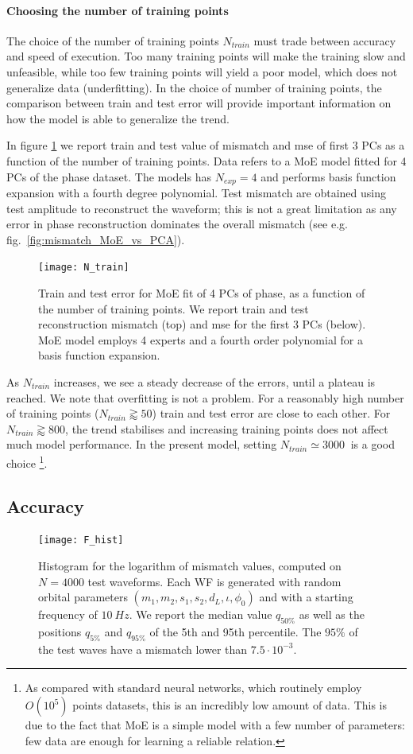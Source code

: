 \paragraph{Choosing the number of training points}
The choice of the number of training points $N_{train}$ must trade between accuracy and speed of execution. Too many training points will make the training slow and unfeasible, while too few training points will yield a poor model, which does not generalize data (underfitting).
In the choice of number of training points, the comparison between train and test error will provide important information on how the model is able to generalize the trend.
\par
In figure \ref{fig:N_train} we report train and test value of mismatch and mse of first 3 PCs as a function of the number of training points. Data refers to a MoE model fitted for 4 PCs of the phase dataset. The models has ${N_{exp} = 4}$ and performs basis function expansion with a fourth degree polynomial. Test mismatch are obtained using test amplitude to reconstruct the waveform; this is not a great limitation as any error in phase reconstruction dominates the overall mismatch (see e.g. fig.~\ref{fig:mismatch_MoE_vs_PCA}).
\begin{figure}
	\centering
    \texttt{[image: N\_train]}
	\caption{Train and test error for MoE fit of 4 PCs of phase, as a function of the number of training points. We report train and test reconstruction mismatch (top) and mse for the first 3 PCs (below).
    MoE model employs 4 experts and a fourth order polynomial for a basis function expansion.
    }
	\label{fig:N_train}
\end{figure}
\par
As $N_{train}$ increases, we see a steady decrease of the errors, until a plateau is reached.
We note that overfitting is not a problem. For a reasonably high number of training points ($N_{train} \gtrapprox 50$) train and test error are close to each other.
For $N_{train} \gtrapprox 800$, the trend stabilises and increasing training points does not affect much model performance.
In the present model, setting $N_{train} \simeq \SI{3000}{}$ is a good choice
\footnote{As compared with standard neural networks, which routinely employ $O(10^5)$ points datasets, this is an incredibly low amount of data. This is due to the fact that MoE is a simple model with a few number of parameters: few data are enough for learning a reliable relation.}.
\subsection{Accuracy}
\begin{figure}
	\centering
    \texttt{[image: F\_hist]}
	\caption{Histogram for the logarithm of mismatch values, computed on $N=4000$ test waveforms. Each WF is generated with random orbital parameters $(m_1,m_2, s_1, s_2, d_L, \iota, \phi_0)$ and with a starting frequency of $\SI{10}{Hz}$.
We report the median value $q_{50\%}$ as well as the positions $q_{5\%}$ and $q_{95\%}$ of the 5th and 95th percentile.
The $95\%$ of the test waves have a mismatch lower than $7.5 \cdot 10^{-3}$.
}
	\label{fig:F_hist}
\end{figure}
